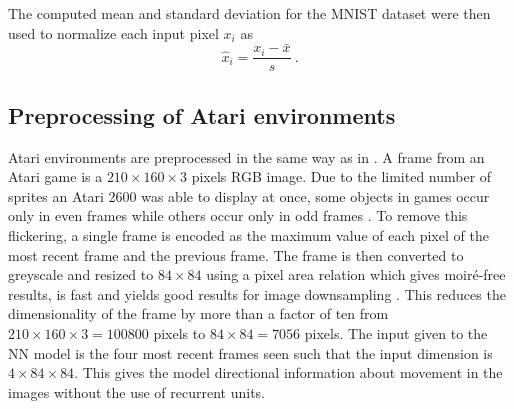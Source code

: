 The computed mean and standard deviation for the \gls{MNIST} dataset were then used to normalize each input pixel $x_i$ as
\begin{equation*}
    \hat{x}_i = \frac{x_i-\bar{x}}{s} \ .
\end{equation*}


\subsection{Preprocessing of Atari environments} \label{sec: Experimental section: Preprocessing of Atari environments}
Atari environments are preprocessed in the same way as in \cite{Mnih2015}. A frame from an Atari game is a $210\times160\times3$ pixels RGB image. Due to the limited number of sprites an Atari 2600 was able to display at once, some objects in games occur only in even frames while others occur only in odd frames \cite{Mnih2015}. To remove this flickering, a single frame is encoded as the maximum value of each pixel of the most recent frame and the previous frame. The frame is then converted to greyscale and resized to $84\times84$ using a pixel area relation which gives moiré-free results, is fast and yields good results for image downsampling \cite{OpenCVDevelopmentTeam2014}. This reduces the dimensionality of the frame by more than a factor of ten from $210\times160\times3=100800$ pixels to $84\times84=7056$ pixels. The input given to the \gls{NN} model is the four most recent frames seen such that the input dimension is $4\times84\times84$. This gives the model directional information about movement in the images without the use of recurrent units.

